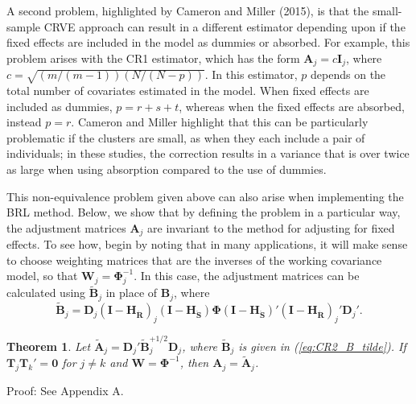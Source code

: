 \documentclass[12pt]{article}
\newtheorem{thm}{Theorem}
\newcommand{\bm}{\mathbf}
\newcommand{\bs}{\boldsymbol}
\begin{document}
A second problem, highlighted by Cameron and Miller (2015), is that the small-sample CRVE approach can result in a different estimator depending upon if the fixed effects are included in the model as dummies or absorbed. 
For example, this problem arises with the CR1 estimator, which has the form $\bm{A}_j = c\bm{I}_j$, where $c = \sqrt{(m/(m-1))(N/(N - p))}$. In this estimator, $p$ depends on the total number of covariates estimated in the model.
When fixed effects are included as dummies, $p = r + s + t$, whereas when the fixed effects are absorbed, instead $p = r$. 
Cameron and Miller highlight that this can be particularly problematic if the clusters are small, as when they each include a pair of individuals; in these studies, the correction results in a variance that is over twice as large when using absorption compared to the use of dummies.

This non-equivalence problem given above can also arise when implementing the BRL method. 
Below, we show that by defining the problem in a particular way, the adjustment matrices $\bm{A}_j$ are invariant to the method for adjusting for fixed effects.
To see how, begin by noting that in many applications, it will make sense to choose weighting matrices that are the inverses of the working covariance model, so that $\bm{W}_j = \bs\Phi_j^{-1}$. In this case, the adjustment matrices can be calculated using $\bm{\tilde{B}}_j$ in place of $\bm{B}_j$, where
\begin{equation}
\label{eq:CR2_B_tilde}
\bm{\tilde{B}}_j = \bm{D}_j\left(\bm{I} - \bm{H_{\ddot{R}}}\right)_j \left(\bm{I} - \bm{H_{\ddot{S}}}\right) \bs\Phi \left(\bm{I} - \bm{H_{\ddot{S}}}\right)' \left(\bm{I} - \bm{H_{\ddot{R}}}\right)_j' \bm{D}_j'.
\end{equation}

\begin{thm}
\label{thm:absorb1}
Let $\bm{\tilde{A}}_j = \bm{D}_j'\bm{\tilde{B}}_j^{+1/2} \bm{D}_j$, where $\bm{\tilde{B}}_j$ is given in (\ref{eq:CR2_B_tilde}). If $\bm{T}_j \bm{T}_k' = \bm{0}$ for $j \neq k$ and $\bm{W} = \bs\Phi^{-1}$, then $\bm{A}_j = \bm{\tilde{A}}_j$. 
\end{thm}
Proof: See Appendix A.
\end{document}
